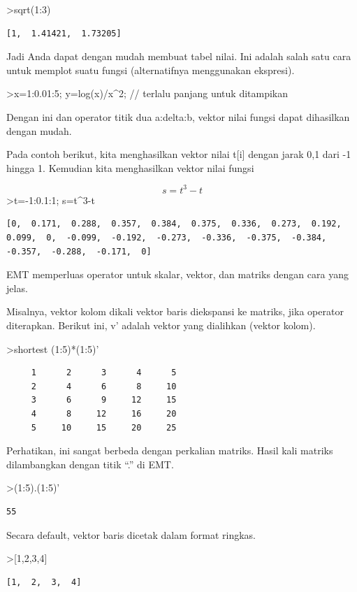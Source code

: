 \documentclass[
]{book}
\begin{document}
\textgreater sqrt(1:3)

\begin{verbatim}
[1,  1.41421,  1.73205]
\end{verbatim}

Jadi Anda dapat dengan mudah membuat tabel nilai. Ini adalah salah satu cara untuk memplot suatu fungsi (alternatifnya menggunakan ekspresi).

\textgreater x=1:0.01:5; y=log(x)/x\^{}2; // terlalu panjang untuk ditampikan

Dengan ini dan operator titik dua a:delta:b, vektor nilai fungsi dapat dihasilkan dengan mudah.

Pada contoh berikut, kita menghasilkan vektor nilai t{[}i{]} dengan jarak 0,1 dari -1 hingga 1. Kemudian kita menghasilkan vektor nilai fungsi

\[s = t^3-t\]\textgreater t=-1:0.1:1; s=t\^{}3-t

\begin{verbatim}
[0,  0.171,  0.288,  0.357,  0.384,  0.375,  0.336,  0.273,  0.192,
0.099,  0,  -0.099,  -0.192,  -0.273,  -0.336,  -0.375,  -0.384,
-0.357,  -0.288,  -0.171,  0]
\end{verbatim}

EMT memperluas operator untuk skalar, vektor, dan matriks dengan cara yang jelas.

Misalnya, vektor kolom dikali vektor baris diekspansi ke matriks, jika operator diterapkan. Berikut ini, v' adalah vektor yang dialihkan (vektor kolom).

\textgreater shortest (1:5)*(1:5)'

\begin{verbatim}
     1      2      3      4      5 
     2      4      6      8     10 
     3      6      9     12     15 
     4      8     12     16     20 
     5     10     15     20     25 
\end{verbatim}

Perhatikan, ini sangat berbeda dengan perkalian matriks. Hasil kali matriks dilambangkan dengan titik ``.'' di EMT.

\textgreater(1:5).(1:5)'

\begin{verbatim}
55
\end{verbatim}

Secara default, vektor baris dicetak dalam format ringkas.

\textgreater{[}1,2,3,4{]}

\begin{verbatim}
[1,  2,  3,  4]
\end{verbatim}
\end{document}
